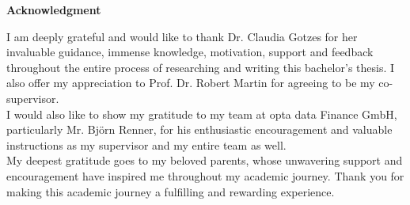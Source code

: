 \begin{center}
    \Large\textbf{Acknowledgment}
\end{center}\vspace{1cm}
\normalsize
I am deeply grateful and would like to thank Dr. Claudia Gotzes for her invaluable guidance, immense knowledge, motivation, support and feedback throughout the entire process of researching and writing this bachelor’s thesis. I also offer my appreciation to Prof. Dr. Robert Martin for agreeing to be my co-supervisor.\\
I would also like to show my gratitude to my team at opta data Finance GmbH, particularly Mr. Björn Renner, for his enthusiastic encouragement and valuable instructions as my supervisor and my entire team as well.\\
My deepest gratitude goes to my beloved parents, whose unwavering support and
encouragement have inspired me throughout my academic journey. Thank you for making this academic journey a fulfilling and rewarding experience.
